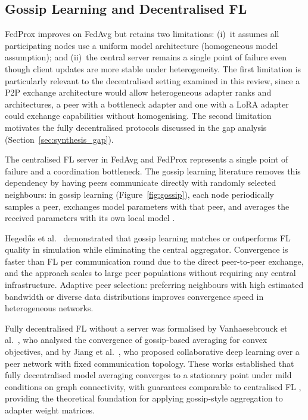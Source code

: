 \subsection{Gossip Learning and Decentralised FL}
\label{sec:p2p_federated:gossip}

FedProx improves on FedAvg but retains two limitations: (i)~it assumes all participating nodes use 
a uniform model architecture (homogeneous model assumption); and (ii)~the central server remains 
a single point of failure even though client updates are more stable under heterogeneity. 
The first limitation is particularly relevant to the decentralised setting examined in this review, 
since a P2P exchange architecture would allow heterogeneous adapter ranks and architectures, a peer with a bottleneck adapter and one with a LoRA adapter could exchange capabilities without homogenising. 
The second limitation motivates the fully decentralised protocols discussed in the gap analysis (Section~\ref{sec:synthesis_gap}).

The centralised FL server in FedAvg and FedProx represents a single point of failure and
a coordination bottleneck. The gossip learning literature removes this dependency by
having peers communicate directly with randomly selected neighbours: in gossip learning
(Figure~\ref{fig:gossip}),
each node periodically samples a peer, exchanges model parameters with that peer, and
averages the received parameters with its own local model \cite{OrmandyGossip2013}.

Heged{\H{u}}s et al.~\cite{HegeduisGossip2019} demonstrated that gossip learning matches or outperforms
FL quality in simulation while eliminating the central aggregator. Convergence is
faster than FL per communication round due to the direct peer-to-peer exchange,
and the approach scales to large peer populations without
requiring any central infrastructure. Adaptive peer selection: preferring neighbours
with high estimated bandwidth or diverse data distributions improves convergence
speed in heterogeneous networks.

Fully decentralised FL without a server was formalised by Vanhaesebrouck et al.~\cite{VanhaesebrouckDCL2017},
who analysed the convergence of gossip-based averaging for convex objectives, and by
Jiang et al.~\cite{JiangCollab2017}, who proposed collaborative deep learning over a peer network
with fixed communication topology. These works established that fully decentralised
model averaging converges to a stationary point under mild conditions on
graph connectivity, with guarantees comparable to centralised FL
\cite{Lian2017Decentralized}, providing the theoretical foundation for applying
gossip-style aggregation to adapter weight matrices.

